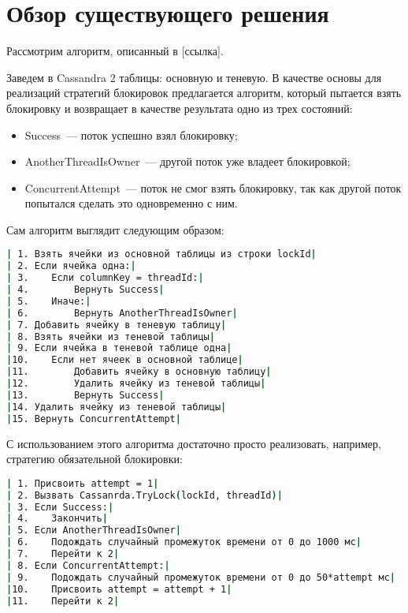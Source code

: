 \section{Обзор существующего решения}

Рассмотрим алгоритм, описанный в [ссылка].

Заведем в Cassandra 2 таблицы: основную и теневую. В качестве основы для реализаций стратегий блокировок предлагается алгоритм, который пытается взять блокировку и возвращает в качестве результата одно из трех состояний:

\begin{itemize}
	\item Success~--- поток успешно взял блокировку;
	\item AnotherThreadIsOwner~--- другой поток уже владеет блокировкой;
	\item ConcurrentAttempt~--- поток не смог взять блокировку, так как другой поток попытался сделать это одновременно с ним.
\end{itemize}

Сам алгоритм выглядит следующим образом:


\begin{lstlisting}[language=csh,caption={Алгоритм Cassandra.TryLock(lockId, threadId)}]
| 1. Взять ячейки из основной таблицы из строки lockId|
| 2. Если ячейка одна:|
| 3. 	Если columnKey = threadId:|
| 4. 		Вернуть Success|
| 5. 	Иначе:|
| 6. 		Вернуть AnotherThreadIsOwner|
| 7. Добавить ячейку в теневую таблицу|
| 8. Взять ячейки из теневой таблицы|
| 9. Если ячейка в теневой таблице одна|
|10. 	Если нет ячеек в основной таблице|
|11. 		Добавить ячейку в основную таблицу|
|12. 		Удалить ячейку из теневой таблицы|
|13. 		Вернуть Success|
|14. Удалить ячейку из теневой таблицы|
|15. Вернуть ConcurrentAttempt|
\end{lstlisting}

С использованием этого алгоритма достаточно просто реализовать, например, стратегию обязательной блокировки:

\begin{lstlisting}[language=csh,caption={Алгоритм Cassandra.GetLock(lockId, threadId)}]
| 1. Присвоить attempt = 1|
| 2. Вызвать Cassanrda.TryLock(lockId, threadId)|
| 3. Если Success:|
| 4. 	Закончить|
| 5. Если AnotherThreadIsOwner|
| 6. 	Подождать случайный промежуток времени от 0 до 1000 мс|
| 7. 	Перейти к 2|
| 8. Если ConcurrentAttempt:|
| 9. 	Подождать случайный промежуток времени от 0 до 50*attempt мс|
|10. 	Присвоить attempt = attempt + 1|
|11. 	Перейти к 2|
\end{lstlisting}

